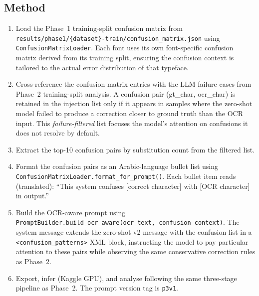 \subsection{Method}
\label{subsec:phase3_method}

\begin{enumerate}
  \item Load the Phase~1 training-split confusion matrix from
        \texttt{results/phase1/\{dataset\}-train/confusion\_matrix.json}
        using \texttt{ConfusionMatrixLoader}. Each font uses its own
        font-specific confusion matrix derived from its training split,
        ensuring the confusion context is tailored to the actual error
        distribution of that typeface.

  \item Cross-reference the confusion matrix entries with the LLM failure
        cases from Phase~2 training-split analysis. A confusion pair
        (gt\_char, ocr\_char) is retained in the injection list only if it
        appears in samples where the zero-shot model failed to produce a
        correction closer to ground truth than the OCR input. This
        \emph{failure-filtered} list focuses the model's attention on
        confusions it does not resolve by default.

  \item Extract the top-10 confusion pairs by substitution count from the
        filtered list.

  \item Format the confusion pairs as an Arabic-language bullet list using
        \texttt{ConfusionMatrixLoader.format\_for\_prompt()}.
        Each bullet item reads (translated): ``This system confuses
        [correct character] with [OCR character] in output.''

  \item Build the OCR-aware prompt using
        \texttt{PromptBuilder.build\_ocr\_aware(ocr\_text, confusion\_context)}.
        The system message extends the zero-shot v2 message with the
        confusion list in a \texttt{<confusion\_patterns>} XML block,
        instructing the model to pay particular attention to these pairs
        while observing the same conservative correction rules as Phase~2.

  \item Export, infer (Kaggle GPU), and analyse following the same three-stage
        pipeline as Phase~2. The prompt version tag is \texttt{p3v1}.
\end{enumerate}

